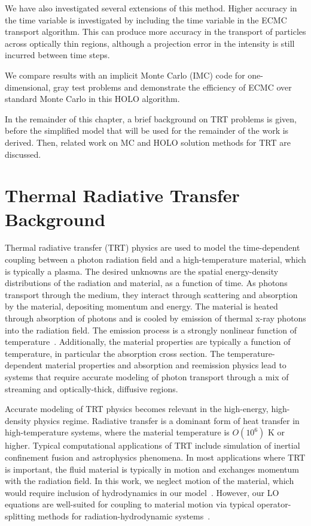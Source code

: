We have also investigated several extensions of this method.  Higher accuracy in the time
variable is investigated by including the time variable in the ECMC transport
algorithm.  This can produce more accuracy in the transport of particles across optically
thin regions, although a projection error in the intensity is still incurred between time
steps.

We compare results with an
implicit Monte Carlo (IMC) code for one-dimensional, gray test problems and 
demonstrate the efficiency of ECMC over standard Monte Carlo in this HOLO algorithm.

In the remainder of this chapter, a brief background on TRT problems is given, before the
simplified model that will be used for the remainder of the work is derived.  Then,
related work on MC and HOLO solution methods for TRT are discussed.

\section{Thermal Radiative Transfer Background}

Thermal radiative transfer (TRT) physics are used to model the time-dependent coupling between a photon
radiation field and a high-temperature material, which is typically a plasma.  The desired unknowns are the spatial
energy-density distributions of the radiation and material, as a function of time.  As photons transport through
the medium, they interact through scattering and absorption by the material, depositing
momentum and energy.  The
material is heated through absorption of photons and is cooled by emission of thermal
x-ray photons
into the radiation field.  The emission process is a strongly nonlinear
function of temperature~\cite{mihalas}.  Additionally, the  material properties are
typically a function of temperature, in particular the absorption cross section.  The
temperature-dependent material properties and
absorption and reemission physics lead to systems that require accurate modeling of
photon transport through a mix of
streaming and optically-thick, diffusive regions. 

Accurate modeling of TRT physics becomes relevant in the high-energy,
high-density physics regime.   Radiative transfer is a dominant form of heat transfer in
high-temperature systems, where the material temperature is $O(10^6)$ K or
higher. Typical computational applications of TRT include simulation of inertial confinement fusion and
astrophysics phenomena.  In most applications where TRT is important, the fluid
material is typically in motion and exchanges momentum with the radiation field. In this work, we neglect
motion of the material, which would require inclusion of hydrodynamics in our
model~\cite{mihalas}.  However, our LO equations are well-suited for
coupling to material motion via typical operator-splitting methods for
radiation-hydrodynamic systems~\cite{radhydro_code,os_rh}.

